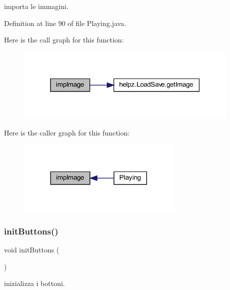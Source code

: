 importa le immagini. 



Definition at line 90 of file Playing.\+java.

Here is the call graph for this function\+:\nopagebreak
\begin{figure}[H]
\begin{center}
\leavevmode
\includegraphics[width=303pt]{classscenes_1_1_playing_aded9c531b53772fd90d09a8b6bf0132e_cgraph}
\end{center}
\end{figure}
Here is the caller graph for this function\+:\nopagebreak
\begin{figure}[H]
\begin{center}
\leavevmode
\includegraphics[width=224pt]{classscenes_1_1_playing_aded9c531b53772fd90d09a8b6bf0132e_icgraph}
\end{center}
\end{figure}
\mbox{\label{classscenes_1_1_playing_a27d3ba5afb772cc36c9a432c28975ace}} 
\subsubsection{\texorpdfstring{init\+Buttons()}{initButtons()}}
{\footnotesize\ttfamily void init\+Buttons (\begin{DoxyParamCaption}{ }\end{DoxyParamCaption})\hspace{0.3cm}{\ttfamily [private]}}



inizializza i bottoni. 



